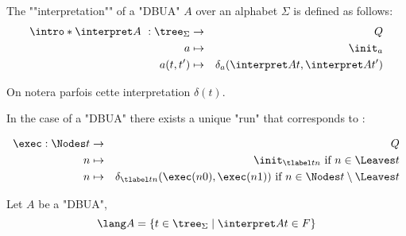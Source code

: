 \documentclass{article}
\begin{document}
\begin{definition}
	The ""interpretation"" of a "DBUA" $A$  over an alphabet $\Sigma$ is defined as follows:
	\begin{eqnarray*}
		\intro* \interpret A ~: \tree_{\Sigma} &\to& Q \\
		a &\mapsto& \init_a \\
		a(t,t') &\mapsto& \delta_a (\interpret A t, \interpret A {t'})
	\end{eqnarray*}

	On notera parfois cette interpretation $\delta(t)$.
\end{definition}

\begin{remark}
	In the case of a "DBUA" there exists a unique "run" that corresponds to :

	\begin{eqnarray*}
		\exec : \Nodes t &\to & Q \\
		n  &\mapsto& \init_{\tlabel t n} \text{ if } n \in \Leaves t \\
		n  &\mapsto& \delta_{\tlabel t n}(\exec (n0), \exec (n1)) \text{ if } n \in \Nodes t \setminus \Leaves t
	\end{eqnarray*}
\end{remark}

\begin{lemma}
	Let $A$ be a "DBUA",
	\[ \lang A = \setdef {t \in \tree_{\Sigma}} {\interpret A t \in F} \]
\end{lemma}
\end{document}
